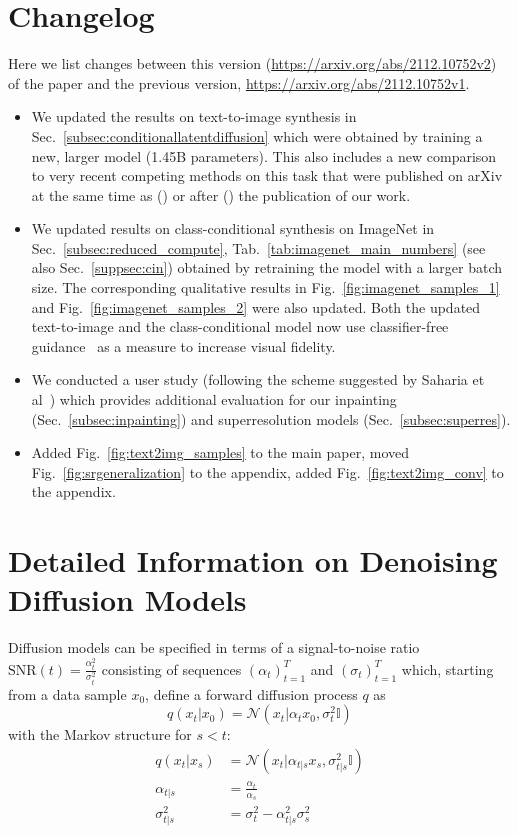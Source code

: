 \documentclass[10pt,twocolumn,letterpaper]{article}
\begin{document}
\section{Changelog}
Here we list changes between this version (\url{https://arxiv.org/abs/2112.10752v2}) of the paper and the previous version, \ie \url{https://arxiv.org/abs/2112.10752v1}. 

\begin{itemize}
\item We updated the results on text-to-image synthesis in Sec.~\ref{subsec:conditionallatentdiffusion} which were obtained by training a new, larger model (1.45B parameters). This also includes a new comparison to very recent competing methods on this task that were published on arXiv at the same time as (\cite{DBLP:journals/corr/abs-2112-10741, DBLP:journals/corr/abs-2111-13792}) or after (\cite{DBLP:journals/corr/abs-2203-13131}) the publication of our work.
\item We updated results on class-conditional synthesis on ImageNet in Sec.~\ref{subsec:reduced_compute}, Tab.~\ref{tab:imagenet_main_numbers} (see also Sec.~\ref{suppsec:cin}) obtained by retraining the model with a larger batch size.
The corresponding qualitative results in Fig.~\ref{fig:imagenet_samples_1} and Fig.~\ref{fig:imagenet_samples_2} were also updated. Both the updated text-to-image and the class-conditional model now use classifier-free guidance~\cite{ho2021classifier} as a measure to increase visual fidelity.
\item We conducted a user study (following the scheme suggested by Saharia et al~\cite{DBLP:journals/corr/abs-2104-07636}) which provides additional evaluation for our inpainting (Sec.~\ref{subsec:inpainting}) and superresolution models (Sec.~\ref{subsec:superres}).
\item Added Fig.~\ref{fig:text2img_samples} to the main paper, moved Fig.~\ref{fig:srgeneralization} to the appendix, added Fig.~\ref{fig:text2img_conv} to the appendix.
\end{itemize}


\newcommand{\normal}{\mathcal{N}}
\newcommand{\I}{\mathbb{I}}
\newcommand{\snr}{\text{SNR}}
\section{Detailed Information on Denoising Diffusion Models}
\label{suppsec:dmdetails}
Diffusion models can be specified in terms of a signal-to-noise ratio
$\snr(t)=\frac{\alpha_t^2}{\sigma_t^2}$ consisting
of sequences $(\alpha_t)_{t=1}^T$ and $(\sigma_t)_{t=1}^T$ which, starting from
a data sample $x_0$, define a forward diffusion process $q$ as
\begin{equation}
  q(x_t \vert x_0) = \normal(x_t \vert \alpha_t x_0, \sigma_t^2 \I)
\end{equation}
with the Markov structure for $s < t$:
\begin{align}
  q(x_t \vert x_s) &= \normal(x_t \vert \alpha_{t\vert s} x_s, \sigma_{t\vert s}^2 \I) \\
  \alpha_{t\vert s} &= \frac{\alpha_t}{\alpha_s} \\
  \sigma_{t\vert s}^2 &= \sigma_t^2 - \alpha_{t\vert s}^2 \sigma_s^2
\end{align}
\end{document}
